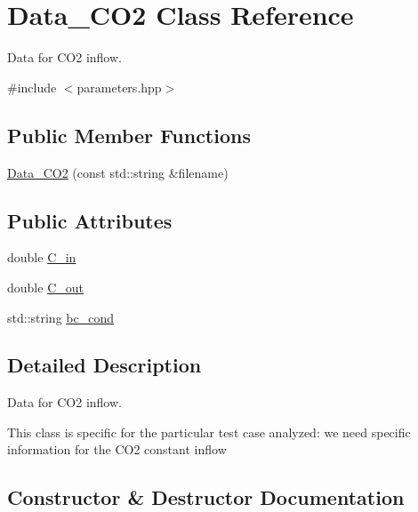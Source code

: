 \hypertarget{classData__CO2}{}\section{Data\+\_\+\+C\+O2 Class Reference}
\label{classData__CO2}


Data for C\+O2 inflow.  




{\ttfamily \#include $<$parameters.\+hpp$>$}

\subsection*{Public Member Functions}
\begin{DoxyCompactItemize}
\item 
\hyperlink{classData__CO2_aaad81b67f6ee1130fa892ff4592fffcb}{Data\+\_\+\+C\+O2} (const std\+::string \&filename)
\end{DoxyCompactItemize}
\subsection*{Public Attributes}
\begin{DoxyCompactItemize}
\item 
double \hyperlink{classData__CO2_ab778c5d4c6789d809e9f38a4a8723d90}{C\+\_\+in}
\item 
double \hyperlink{classData__CO2_a57771d0dfef60d0de3eec5fe26649c19}{C\+\_\+out}
\item 
std\+::string \hyperlink{classData__CO2_a4e766fbbb699414eca692f02d5d3da50}{bc\+\_\+cond}
\end{DoxyCompactItemize}


\subsection{Detailed Description}
Data for C\+O2 inflow. 

This class is specific for the particular test case analyzed\+: we need specific information for the C\+O2 constant inflow 

\subsection{Constructor \& Destructor Documentation}
\mbox{\label{classData__CO2_aaad81b67f6ee1130fa892ff4592fffcb}} 
